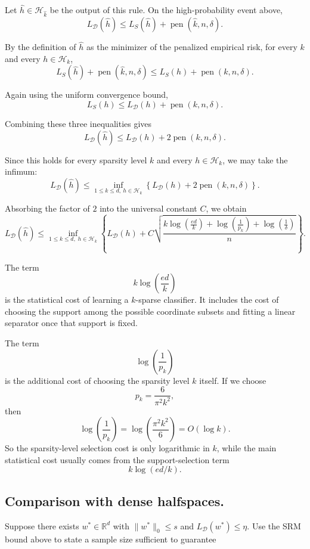 \documentclass[11pt]{article}
\newcommand{\calD}{\mathcal{D}}
\newcommand{\calH}{\mathcal{H}}
\begin{document}
\begin{solutionbox}
Let $\hat h\in\calH_{\hat k}$ be the output of this rule. On the high-probability event above,
\[
L_{\calD}(\hat h)
\le
L_S(\hat h)+\operatorname{pen}(\hat k,n,\delta).
\]

By the definition of $\hat h$ as the minimizer of the penalized empirical risk, for every $k$ and every $h\in\calH_k$,
\[
L_S(\hat h)+\operatorname{pen}(\hat k,n,\delta)
\le
L_S(h)+\operatorname{pen}(k,n,\delta).
\]

Again using the uniform convergence bound,
\[
L_S(h)
\le
L_{\calD}(h)+\operatorname{pen}(k,n,\delta).
\]

Combining these three inequalities gives
\[
L_{\calD}(\hat h)
\le
L_{\calD}(h)+2\operatorname{pen}(k,n,\delta).
\]

Since this holds for every sparsity level $k$ and every $h\in\calH_k$, we may take the infimum:
\[
L_{\calD}(\hat h)
\le
\inf_{1\le k\le d,\ h\in\calH_k}
\left\{
L_{\calD}(h)+2\operatorname{pen}(k,n,\delta)
\right\}.
\]

Absorbing the factor of $2$ into the universal constant $C$, we obtain
\[
\boxed{
L_{\mathcal{D}}(\hat{h})
\le
\inf_{1 \le k \le d,\; h \in \mathcal{H}_k}
\left\{
L_{\mathcal{D}}(h)
+
C \sqrt{
\frac{
k \log\!\left(\frac{ed}{k}\right)
+
\log\!\left(\frac{1}{p_k}\right)
+
\log\!\left(\frac{1}{\delta}\right)
}{
n}
}
\right\}.
}
\]

The term
\[
k\log\left(\frac{ed}{k}\right)
\]
is the statistical cost of learning a $k$-sparse classifier. It includes the cost of choosing the support among the possible coordinate subsets and fitting a linear separator once that support is fixed.

The term
\[
\log\left(\frac{1}{p_k}\right)
\]
is the additional cost of choosing the sparsity level $k$ itself. If we choose
\[
p_k=\frac{6}{\pi^2k^2},
\]
then
\[
\log\left(\frac{1}{p_k}\right)
=
\log\left(\frac{\pi^2k^2}{6}\right)
=
O(\log k).
\]
So the sparsity-level selection cost is only logarithmic in $k$, while the main statistical cost usually comes from the support-selection term
\[
k\log(ed/k).
\]

\end{solutionbox}


\subsection{Comparison with dense halfspaces.}
Suppose there exists $w^\ast \in \mathbb{R}^d$ with $\|w^\ast\|_0 \le s$ and 
$L_{\mathcal{D}}(w^\ast) \le \eta$. Use the SRM bound above to state a sample size 
sufficient to guarantee
\end{document}
